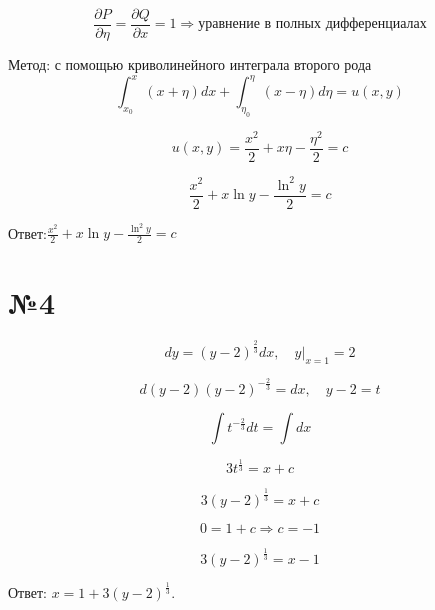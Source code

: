 \documentclass{article}
\begin{document}
\begin{equation*}
    \frac{\partial P}{\partial \eta}=\frac{\partial Q}{\partial x}=1 \Rightarrow \text{уравнение в полных дифференциалах}
\end{equation*}

Метод: с помощью криволинейного интеграла второго рода
\begin{equation*}
    \int_{x_0}^{x}(x+\eta)dx+\int_{\eta_0}^{\eta}(x-\eta)d\eta=u(x,y)
\end{equation*}

\begin{equation*}
    u(x,y)=\frac{x^2}{2}+x\eta-\frac{\eta^2}{2}=c
\end{equation*}

\begin{equation*}
    \frac{x^2}{2}+x\ln y-\frac{\ln^2{y}}{2}=c
\end{equation*}

Ответ:$\frac{x^2}{2}+x\ln y-\frac{\ln^2{y}}{2}=c$

\section*{№4}

\begin{equation*}
    dy=(y-2)^{\frac{2}{3}}dx,\quad y|_{x=1}=2
\end{equation*}

\begin{equation*}
    d(y-2)(y-2)^{-\frac{2}{3}}=dx, \quad y-2=t
\end{equation*}

\begin{equation*}
    \int t^{-\frac{2}{3}}dt=\int dx
\end{equation*}

\begin{equation*}
    3t^{\frac{1}{3}}=x+c
\end{equation*}

\begin{equation*}
    3(y-2)^{\frac{1}{3}}=x+c
\end{equation*}

\begin{equation*}
    0=1+c \Rightarrow c=-1
\end{equation*}

\begin{equation*}
    3(y-2)^{\frac{1}{3}}=x-1
\end{equation*}

Ответ: $x=1+3(y-2)^{\frac{1}{3}}$.
\end{document}
